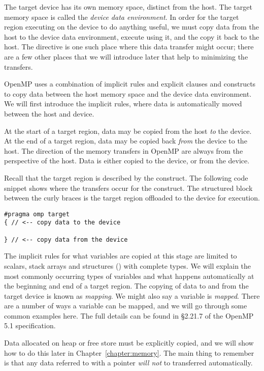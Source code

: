 The target device has its own memory space, distinct from the host.
The target memory space is called the \emph{device data environment}.
In order for the target region executing on the device to do anything useful, we must copy data from the host to the device data environment, execute using it, and the copy it back to the host.
The  directive is one such place where this data transfer might occur; there are a few other places that we will introduce later that help to minimizing the transfers.

OpenMP uses a combination of implicit rules and explicit clauses and constructs to copy data between the host memory space and the device data environment.
We will first introduce the implicit rules, where data is automatically moved between the host and device.

At the start of a target region, data may be copied from the host \emph{to} the device.
At the end of a target region, data may be copied back \emph{from} the device to the host.
The direction of the memory transfers in OpenMP are always from the perspective of the host.
Data is either copied to the device, or from the device.

Recall that the target region is described by the  construct.
The following code snippet shows where the transfers occur for the  construct.
The structured block between the curly braces is the target region offloaded to the device for execution.
\begin{verbatim}
#pragma omp target
{ // <-- copy data to the device

} // <-- copy data from the device
\end{verbatim}

The implicit rules for what variables are copied at this stage are limited to scalars, stack arrays and structures () with complete types.
We will explain the most commonly occurring types of variables and what happens automatically at the beginning and end of a target region.
The copying of data to and from the target device is known as \emph{mapping}.
We might also say a variable is \emph{mapped}.
There are a number of ways a variable can be mapped, and we will go through some common examples here.
The full details can be found in \S2.21.7 of the OpenMP 5.1 specification.

Data allocated on heap or free store must be explicitly copied, and we will show how to do this later in Chapter~\ref{chapter:memory}.
The main thing to remember is that any data referred to with a pointer \emph{will not} to transferred automatically.

